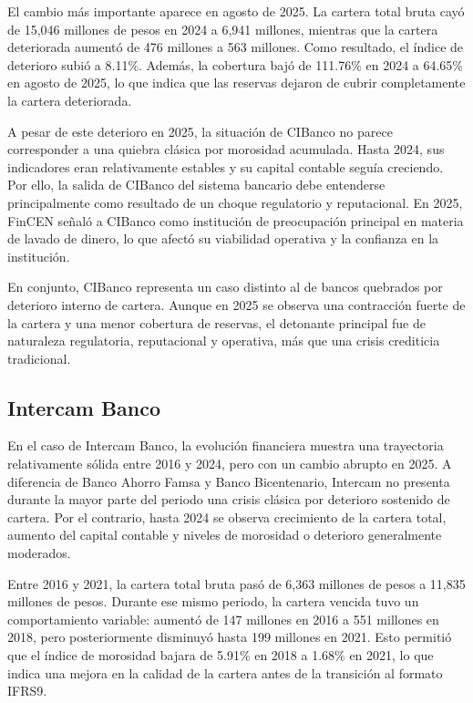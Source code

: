 El cambio más importante aparece en agosto de 2025. La cartera total bruta cayó de 15,046 millones de pesos en 2024 a 6,941 millones, mientras que la cartera deteriorada aumentó de 476 millones a 563 millones. Como resultado, el índice de deterioro subió a 8.11\%. Además, la cobertura bajó de 111.76\% en 2024 a 64.65\% en agosto de 2025, lo que indica que las reservas dejaron de cubrir completamente la cartera deteriorada.

A pesar de este deterioro en 2025, la situación de CIBanco no parece corresponder a una quiebra clásica por morosidad acumulada. Hasta 2024, sus indicadores eran relativamente estables y su capital contable seguía creciendo. Por ello, la salida de CIBanco del sistema bancario debe entenderse principalmente como resultado de un choque regulatorio y reputacional. En 2025, FinCEN señaló a CIBanco como institución de preocupación principal en materia de lavado de dinero, lo que afectó su viabilidad operativa y la confianza en la institución.

En conjunto, CIBanco representa un caso distinto al de bancos quebrados por deterioro interno de cartera. Aunque en 2025 se observa una contracción fuerte de la cartera y una menor cobertura de reservas, el detonante principal fue de naturaleza regulatoria, reputacional y operativa, más que una crisis crediticia tradicional.
\subsection{Intercam Banco}
En el caso de Intercam Banco, la evolución financiera muestra una trayectoria relativamente sólida entre 2016 y 2024, pero con un cambio abrupto en 2025. A diferencia de Banco Ahorro Famsa y Banco Bicentenario, Intercam no presenta durante la mayor parte del periodo una crisis clásica por deterioro sostenido de cartera. Por el contrario, hasta 2024 se observa crecimiento de la cartera total, aumento del capital contable y niveles de morosidad o deterioro generalmente moderados.

Entre 2016 y 2021, la cartera total bruta pasó de 6,363 millones de pesos a 11,835 millones de pesos. Durante ese mismo periodo, la cartera vencida tuvo un comportamiento variable: aumentó de 147 millones en 2016 a 551 millones en 2018, pero posteriormente disminuyó hasta 199 millones en 2021. Esto permitió que el índice de morosidad bajara de 5.91\% en 2018 a 1.68\% en 2021, lo que indica una mejora en la calidad de la cartera antes de la transición al formato IFRS9.

